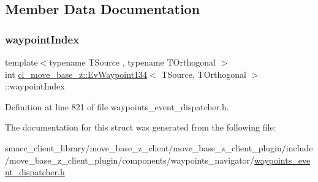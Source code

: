 \subsection{Member Data Documentation}
\mbox{\label{structcl__move__base__z_1_1EvWaypoint134_ad1365a0535f1b315b48e3d0c4e139c08}} 
\subsubsection{\texorpdfstring{waypoint\+Index}{waypointIndex}}
{\footnotesize\ttfamily template$<$typename T\+Source , typename T\+Orthogonal $>$ \\
int \hyperlink{structcl__move__base__z_1_1EvWaypoint134}{cl\+\_\+move\+\_\+base\+\_\+z\+::\+Ev\+Waypoint134}$<$ T\+Source, T\+Orthogonal $>$\+::waypoint\+Index}



Definition at line 821 of file waypoints\+\_\+event\+\_\+dispatcher.\+h.



The documentation for this struct was generated from the following file\+:\begin{DoxyCompactItemize}
\item 
smacc\+\_\+client\+\_\+library/move\+\_\+base\+\_\+z\+\_\+client/move\+\_\+base\+\_\+z\+\_\+client\+\_\+plugin/include/move\+\_\+base\+\_\+z\+\_\+client\+\_\+plugin/components/waypoints\+\_\+navigator/\hyperlink{waypoints__event__dispatcher_8h}{waypoints\+\_\+event\+\_\+dispatcher.\+h}\end{DoxyCompactItemize}
